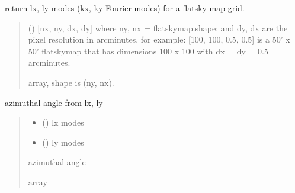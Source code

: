 \documentclass[letterpaper,10pt,english]{sphinxmanual}
\begin{document}

\begin{fulllineitems}
\label{\detokenize{flatsky:flatsky.get_lxly}}
\pysigstartsignatures
{}
\pysigstopsignatures
\sphinxAtStartPar
return lx, ly modes (kx, ky Fourier modes) for a flatsky map grid.
\begin{quote}\begin{description}
\sphinxAtStartPar
{} () \textendash{} {[}nx, ny, dx, dy{]} where ny, nx = flatskymap.shape; and dy, dx are the pixel resolution in arcminutes.
for example: {[}100, 100, 0.5, 0.5{]} is a 50’ x 50’ flatskymap that has dimensions 100 x 100 with dx = dy = 0.5 arcminutes.

\sphinxAtStartPar
{}

\sphinxAtStartPar
array, shape is (ny, nx).

\end{description}\end{quote}

\end{fulllineitems}


\begin{fulllineitems}
\label{\detokenize{flatsky:flatsky.get_lxly_az_angle}}
\pysigstartsignatures
{}
\pysigstopsignatures
\sphinxAtStartPar
azimuthal angle from lx, ly
\begin{quote}\begin{description}
\begin{itemize}
\item {} 
\sphinxAtStartPar
{} () \textendash{} lx modes

\item {} 
\sphinxAtStartPar
{} () \textendash{} ly modes

\end{itemize}

\sphinxAtStartPar
{} \textendash{} azimuthal angle

\sphinxAtStartPar
array

\end{description}\end{quote}

\end{fulllineitems}
\end{document}
